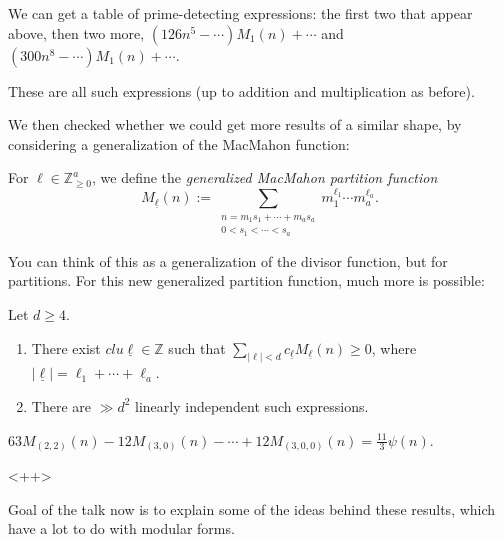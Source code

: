 \documentclass[reqno]{amsart} 
\begin{document}
We can get a table of prime-detecting expressions: the first two that appear above, then two more, $(126 n^5 - \dotsb) M_1(n) + \dotsb$ and $(300 n^8 - \dotsb) M_1(n) + \dotsb$.

\begin{conjecture}
  These are all such expressions (up to addition and multiplication as before).
\end{conjecture}

We then checked whether we could get more results of a similar shape, by considering a generalization of the MacMahon function:
\begin{definition}
  For $\ell \in \mathbb{Z}_{\geq 0}^a$, we define the \emph{generalized MacMahon partition function}
  \begin{equation*}
    M_{\underline{\ell}}(n) := \sum_{
      \substack{
        n = m_1 s_1 + \dotsb + m_a s_a  \\
        0 < s_1 < \dotsb < s_a        
      }
    }
    m_1^{\ell_1} \dotsb m_a^{\ell_a}.
  \end{equation*}
\end{definition}
You can think of this as a generalization of the divisor function, but for partitions.  For this new generalized partition function, much more is possible:
\begin{theorem} Let $d \geq 4$.
  \begin{enumerate}
  \item There exist $clu \underline{\ell} \in \mathbb{Z}$ such that $\sum_{\lvert \ell \rvert < d} c_{\underline{\ell}} M_{\underline{\ell}}(n) \geq 0$, where $\lvert \underline{\ell} \rvert = \ell_1 + \dotsb + \ell_a$.
  \item There are $\gg d^2$ linearly independent such expressions.
  \end{enumerate}
\end{theorem}
\begin{example}
  $63 M_{(2, 2)}(n) - 12 M_{(3,0)}(n) - \dotsb + 12 M_{(3,0,0)}(n) = \frac{11}{3} \psi(n)$.
\end{example}<++>

Goal of the talk now is to explain some of the ideas behind these results, which have a lot to do with modular forms.
\end{document}

